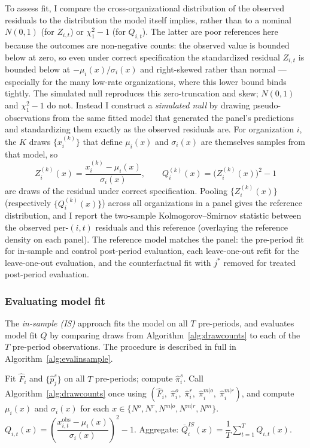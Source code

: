 \documentclass[source/paper/main.tex]{subfiles}
\begin{document}
To assess fit, I compare the cross-organizational distribution of the observed residuals to the distribution the model itself implies, rather than to a nominal $N(0,1)$ (for $Z_{i,t}$) or $\chi^2_1-1$ (for $Q_{i,t}$).
The latter are poor references here because the outcomes are non-negative counts: the observed value is bounded below at zero, so even under correct specification the standardized residual $Z_{i,t}$ is bounded below at $-\mu_i(x)/\sigma_i(x)$ and right-skewed rather than normal --- especially for the many low-rate organizations, where this lower bound binds tightly.
The simulated null reproduces this zero-truncation and skew; $N(0,1)$ and $\chi^2_1-1$ do not.
Instead I construct a \emph{simulated null} by drawing pseudo-observations from the same fitted model that generated the panel's predictions and standardizing them exactly as the observed residuals are.
For organization $i$, the $K$ draws $\{x_i^{(k)}\}$ that define $\mu_i(x)$ and $\sigma_i(x)$ are themselves samples from that model, so
$$Z_i^{(k)}(x) = \frac{x_i^{(k)} - \mu_i(x)}{\sigma_i(x)}, \qquad Q_i^{(k)}(x) = \bigl(Z_i^{(k)}(x)\bigr)^2 - 1$$
are draws of the residual under correct specification.
Pooling $\{Z_i^{(k)}(x)\}$ (respectively $\{Q_i^{(k)}(x)\}$) across all organizations in a panel gives the reference distribution, and I report the two-sample Kolmogorov--Smirnov statistic between the observed per-$(i,t)$ residuals and this reference (overlaying the reference density on each panel).
The reference model matches the panel: the pre-period fit for in-sample and control post-period evaluation, each leave-one-out refit for the leave-one-out evaluation, and the counterfactual fit with $j^*$ removed for treated post-period evaluation.

\subsubsection{Evaluating model fit}

The \emph{in-sample (IS)} approach fits the model on all $T$ pre-periods, and evaluates model fit $Q$ by comparing draws from Algorithm~\ref{alg:drawcounts} to each of the $T$ pre-period observations.
The procedure is described in full in Algorithm~\ref{alg:evalinsample}.

\begin{algorithm}[h]
\caption{EvalInSample(org $i$)}
\label{alg:evalinsample}
\begin{algorithmic}[1]
\State Fit $\hat{F}_i$ and $\{\hat{p}_j^s\}$ on all $T$ pre-periods; compute $\hat{\pi}_i^s$.
\State Call Algorithm~\ref{alg:drawcounts} once using $(\hat{F}_i,\;\hat{\pi}_i^o,\;\hat{\pi}_i^r,\;\hat{\pi}_i^{m|o},\;\hat{\pi}_i^{m|r})$, and compute $\mu_i(x)$ and $\sigma_i(x)$ for each $x \in \{N^o, N^r, N^{m|o}, N^{m|r}, N^m\}$.
  \State $Q_{i,t}(x) = \left(\dfrac{x_{i,t}^{\mathrm{obs}} - \mu_i(x)}{\sigma_i(x)}\right)^2 - 1.$
\EndFor
\State Aggregate: $\bar{Q}_i^{IS}(x) = \dfrac{1}{T}\displaystyle\sum_{t=1}^T Q_{i,t}(x)$.
\end{algorithmic}
\end{algorithm}
\end{document}
